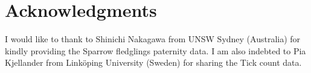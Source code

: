 \hypertarget{acknowledgments}{%
\section{Acknowledgments}\label{acknowledgments}}

I would like to thank to Shinichi Nakagawa from UNSW Sydney (Australia)
for kindly providing the Sparrow fledglings paternity data. I am also
indebted to Pia Kjellander from Linköping University (Sweden) for
sharing the Tick count data.



\address{%
Josep L. Carrasco\\
University of Barcelona\\%
Biostatistics. Department of Basic Clinical Practice\\ Casanova 143,
08036, Barcelona, Spain\\
%
\url{https://webgrec.ub.edu/webpages/personal/ang/005037_jlcarrasco.ub.edu.html}\\%
\textit{ORCiD: \href{https://orcid.org/0000-0003-1184-0753}{0000-0003-1184-0753}}\\%
\href{mailto:jlcarrasco@ub.edu}{\nolinkurl{jlcarrasco@ub.edu}}%
}
